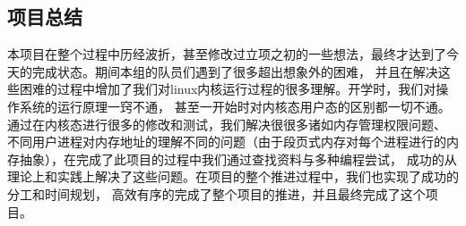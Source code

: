 \documentclass[AutoFakeBold,a4paper]{ctexart}
\begin{document}
\subsection{项目总结}
本项目在整个过程中历经波折，甚至修改过立项之初的一些想法，最终才达到了今天的完成状态。期间本组的队员们遇到了很多超出想象外的困难，
并且在解决这些困难的过程中增加了我们对linux内核运行过程的很多理解。开学时，我们对操作系统的运行原理一窍不通，
甚至一开始时对内核态用户态的区别都一切不通。通过在内核态进行很多的修改和测试，我们解决很很多诸如内存管理权限问题、
不同用户进程对内存地址的理解不同的问题（由于段页式内存对每个进程进行的内存抽象），在完成了此项目的过程中我们通过查找资料与多种编程尝试，
成功的从理论上和实践上解决了这些问题。在项目的整个推进过程中，我们也实现了成功的分工和时间规划，
高效有序的完成了整个项目的推进，并且最终完成了这个项目。



\end{document}
